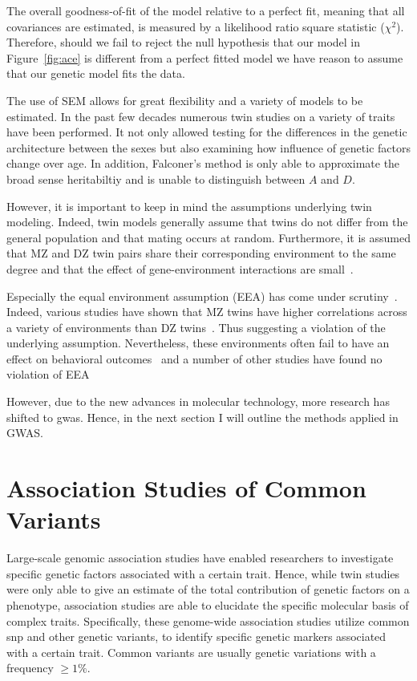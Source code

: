 The overall goodness-of-fit of the model relative to a perfect fit, meaning that all covariances are estimated, is measured by a likelihood ratio square statistic ($\chi^2$).
Therefore, should we fail to reject the null hypothesis that our model in Figure~\ref{fig:ace} is different from a perfect fitted model we have reason to assume that our genetic model fits the data.

The use of SEM allows for great flexibility and a variety of models to be estimated.
In the past few decades numerous twin studies on a variety of traits have been performed.
It not only allowed testing for the differences in the genetic architecture between the sexes but also examining how influence of genetic factors change over age.
In addition, Falconer's method is only able to approximate the broad sense heritabiltiy and is unable to distinguish between $A$ and $D$.

However, it is important to keep in mind the assumptions underlying twin modeling.
Indeed, twin models generally assume that twins do not differ from the general population and that mating occurs at random.
Furthermore, it is assumed that MZ and DZ twin pairs share their corresponding environment to the same degree and that the effect of gene-environment interactions are small~\cite{Rijsdijk2002}.

Especially the equal environment assumption (EEA) has come under scrutiny~\cite{Martin1997}. 
Indeed, various studies have shown that MZ twins have higher correlations across a variety of environments than DZ twins~\cite{Loehlin1976}.
Thus suggesting a violation of the underlying assumption.
Nevertheless, these environments often fail to have an effect on behavioral outcomes~\cite{Lytton1977} and a number of other studies have found no violation of EEA~\cite{Rijsdijk2002,Tuvblad2011a,Freitag2010,Derks2006}

However, due to the new advances in molecular technology, more research has shifted to \acrfull{gwas}.
Hence, in the next section I will outline the methods applied in GWAS\@.

\section{Association Studies of Common Variants}
\label{sec:association_studies_of_common_variants}

Large-scale genomic association studies have enabled researchers to investigate specific genetic factors associated with a certain trait.
Hence, while twin studies were only able to give an estimate of the total contribution of genetic factors on a phenotype, association studies are able to elucidate the specific molecular basis of complex traits.
Specifically, these genome-wide association studies utilize common \acrfull{snp} and other genetic variants, to identify specific genetic markers associated with a certain trait.
Common variants are usually genetic variations with a frequency $\ge 1\%$.

